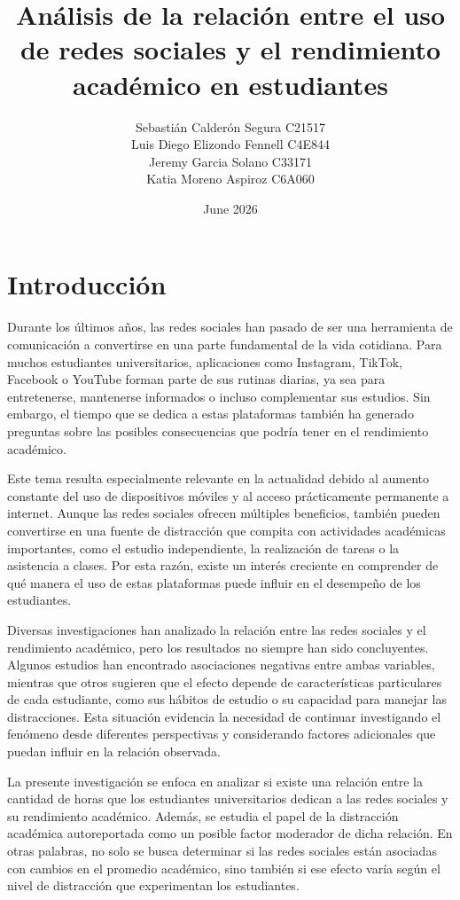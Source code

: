 \documentclass[12pt]{article}
\title{Análisis de la relación entre el uso de redes sociales y el rendimiento académico en estudiantes\vspace{11cm}}
\author{Sebastián Calderón Segura C21517\\
Luis Diego Elizondo Fennell C4E844\\
Jeremy Garcia Solano C33171\\
Katia Moreno Aspiroz C6A060\vspace{2cm}}
\date{June 2026}
\begin{document}
\maketitle

\newpage

\section*{Introducción}
Durante los últimos años, las redes sociales han pasado de ser una herramienta de comunicación a convertirse en una parte fundamental de la vida cotidiana. Para muchos estudiantes universitarios, aplicaciones como Instagram, TikTok, Facebook o YouTube forman parte de sus rutinas diarias, ya sea para entretenerse, mantenerse informados o incluso complementar sus estudios. Sin embargo, el tiempo que se dedica a estas plataformas también ha generado preguntas sobre las posibles consecuencias que podría tener en el rendimiento académico.

Este tema resulta especialmente relevante en la actualidad debido al aumento constante del uso de dispositivos móviles y al acceso prácticamente permanente a internet. Aunque las redes sociales ofrecen múltiples beneficios, también pueden convertirse en una fuente de distracción que compita con actividades académicas importantes, como el estudio independiente, la realización de tareas o la asistencia a clases. Por esta razón, existe un interés creciente en comprender de qué manera el uso de estas plataformas puede influir en el desempeño de los estudiantes.

Diversas investigaciones han analizado la relación entre las redes sociales y el rendimiento académico, pero los resultados no siempre han sido concluyentes. Algunos estudios han encontrado asociaciones negativas entre ambas variables, mientras que otros sugieren que el efecto depende de características particulares de cada estudiante, como sus hábitos de estudio o su capacidad para manejar las distracciones. Esta situación evidencia la necesidad de continuar investigando el fenómeno desde diferentes perspectivas y considerando factores adicionales que puedan influir en la relación observada.

La presente investigación se enfoca en analizar si existe una relación entre la cantidad de horas que los estudiantes universitarios dedican a las redes sociales y su rendimiento académico. Además, se estudia el papel de la distracción académica autoreportada como un posible factor moderador de dicha relación. En otras palabras, no solo se busca determinar si las redes sociales están asociadas con cambios en el promedio académico, sino también si ese efecto varía según el nivel de distracción que experimentan los estudiantes.
\end{document}
